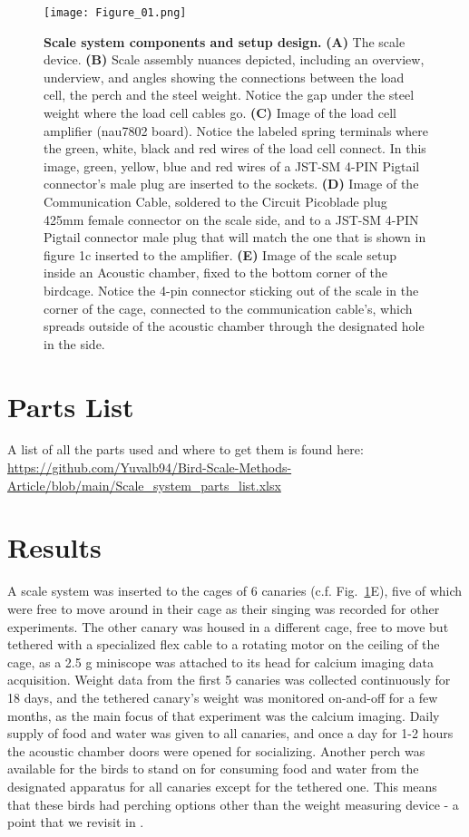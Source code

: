 \documentclass{article}
\begin{document}
\begin{figure}
    \centering
    \texttt{[image: Figure\_01.png]}
    \caption{{\bf Scale system components and setup design.}
    \textbf{(A)} The scale device. 
    \textbf{(B)} Scale assembly nuances depicted, including an overview, underview, and angles showing the connections between the load cell, the perch and the steel weight. Notice the gap under the steel weight where the load cell cables go. 
    \textbf{(C)} Image of the load cell amplifier (nau7802 board). Notice the labeled spring terminals where the green, white, black and red wires of the load cell connect. In this image, green, yellow, blue and red wires of a JST-SM 4-PIN Pigtail connector’s male plug are inserted to the sockets. 
    \textbf{(D)} Image of the Communication Cable, soldered to the Circuit Picoblade plug 425mm female connector on the scale side, and to a JST-SM 4-PIN Pigtail connector male plug that will match the one that is shown in figure 1c inserted to the amplifier. 
    \textbf{(E)} Image of the scale setup inside an Acoustic chamber, fixed to the bottom corner of the birdcage. Notice the 4-pin connector sticking out of the scale in the corner of the cage, connected to the communication cable’s, which spreads outside of the acoustic chamber through the designated hole in the side.}
    \label{fig:system-design}
\end{figure}

\section{Parts List}

A list of all the parts used and where to get them is found here: \url{https://github.com/Yuvalb94/Bird-Scale-Methods-Article/blob/main/Scale_system_parts_list.xlsx} 

\section{Results}

A scale system was inserted to the cages of 6 canaries (c.f. Fig.~\ref{fig:system-design}E), five of which were free to move around in their cage as their singing was recorded for other experiments. The other canary was housed in a different cage, free to move but tethered with a specialized flex cable to a rotating motor on the ceiling of the cage, as a 2.5 g miniscope was attached to its head for calcium imaging data acquisition. Weight data from the first 5 canaries was collected continuously for 18 days, and the tethered canary's weight was monitored on-and-off for a few months, as the main focus of that experiment was the calcium imaging. Daily supply of food and water was given to all canaries, and once a day for 1-2 hours the acoustic chamber doors were opened for socializing. Another perch was available for the birds to stand on for consuming food and water from the designated apparatus for all canaries except for the tethered one. This means that these birds had perching options other than the weight measuring device - a point that we revisit in . 
\end{document}
